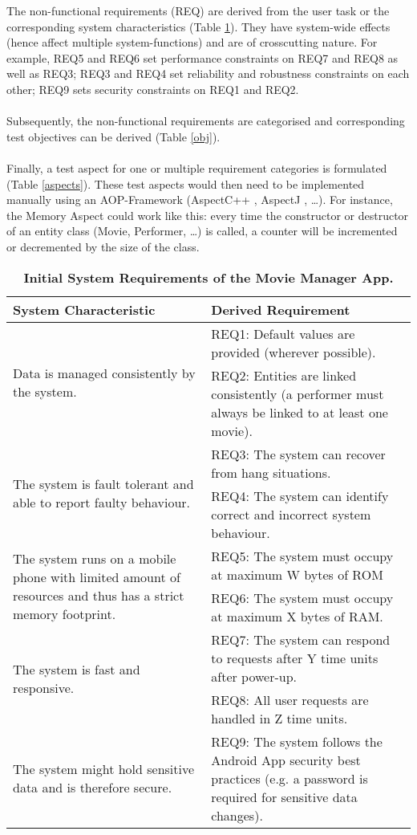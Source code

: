  The non-functional requirements (REQ) are derived from the user task or the corresponding system characteristics (Table \ref{req}). They have system-wide effects (hence affect multiple system-functions) and are of crosscutting nature. For example, REQ5 and REQ6 set performance constraints on REQ7 and REQ8 as well as REQ3; REQ3 and REQ4 set reliability and robustness constraints on each other; REQ9 sets security constraints on REQ1 and REQ2.\\
\\
 Subsequently, the non-functional requirements are categorised and corresponding test objectives can be derived (Table \ref{obj}).\\
\\
Finally, a test aspect for one or multiple requirement categories is formulated (Table \ref{aspects}). These test aspects would then need to be implemented manually using an AOP-Framework (AspectC++ \cite{C++}, AspectJ \cite{J}, …). For instance, the Memory Aspect could work like this: every time the constructor or destructor of an entity class (Movie, Performer, …) is called, a counter will be incremented or decremented by the size of the class.

\begin{table}[h]
\caption{\textbf{Initial System Requirements of the Movie Manager App.}}
\begin{tabular}{|p{7cm}|p{7cm}|}
\hline
\textbf{System Characteristic} & \textbf{Derived Requirement}\\
\hline
\multirow{2}{6.5cm}{Data is managed consistently by the system.} & REQ1: Default values are provided (wherever possible).\\
 & REQ2: Entities are linked consistently (a performer must always be linked to at least one movie).\\ 
\hline  
\multirow{2}{6.5cm}{The system is fault tolerant and able to report faulty behaviour.} & REQ3: The system can recover from hang situations.\\
 & REQ4: The system can identify correct and incorrect system behaviour.\\
\hline 
\multirow{2}{6.5cm}{The system runs on a mobile phone with limited amount of resources and thus has a strict memory footprint.} & REQ5: The system must occupy at maximum W bytes of ROM\\
 & REQ6: The system must occupy at maximum X bytes of RAM.\\
\hline 
\multirow{2}{6.5cm}{The system is fast and responsive.} & REQ7: The system can respond to requests after Y time units after power-up.\\
 & REQ8: All user requests are handled in Z time units.\\
\hline  
The system might hold sensitive data and is therefore secure. & REQ9: The system follows the Android App security best practices (e.g. a password is required for sensitive data changes).\\
\hline
\end{tabular}
\label{req}
\end{table}

